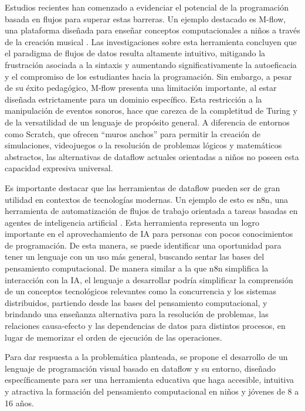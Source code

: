 Estudios recientes han comenzado a evidenciar el potencial de la programación basada en flujos para superar estas barreras. Un ejemplo destacado es M-flow, una plataforma diseñada para enseñar conceptos computacionales a niños a través de la creación musical \cite{mflow2023}. Las investigaciones sobre esta herramienta concluyen que el paradigma de flujos de datos resulta altamente intuitivo, mitigando la frustración asociada a la sintaxis y aumentando significativamente la autoeficacia y el compromiso de los estudiantes hacia la programación. Sin embargo, a pesar de su éxito pedagógico, M-flow presenta una limitación importante, al estar diseñada estrictamente para un dominio específico. Esta restricción a la manipulación de eventos sonoros, hace que carezca de la completitud de Turing y de la versatilidad de un lenguaje de propósito general. A diferencia de entornos como Scratch, que ofrecen ``muros anchos'' \cite{resnicketal2009} para permitir la creación de simulaciones, videojuegos o la resolución de problemas lógicos y matemáticos abstractos, las alternativas de dataflow actuales orientadas a niños no poseen esta capacidad expresiva universal.

Es importante destacar que las herramientas de dataflow pueden ser de gran utilidad en contextos de tecnologías modernas. Un ejemplo de esto es n8n, una herramienta de automatización de flujos de trabajo orientada a tareas basadas en agentes de inteligencia artificial \cite{n8n2025}. Esta herramienta representa un logro importante en el aprovechamiento de IA para personas con pocos conocimientos de programación. De esta manera, se puede identificar una oportunidad para tener un lenguaje con un uso más general, buscando sentar las bases del pensamiento computacional. De manera similar a la que n8n simplifica la interacción con la IA, el lenguaje a desarrollar podría simplificar la comprensión de un conceptos tecnológicos relevantes como la concurrencia y los sistemas distribuidos, partiendo desde las bases del pensamiento computacional, y brindando una enseñanza alternativa para la resolución de problemas, las relaciones causa-efecto y las dependencias de datos para distintos procesos, en lugar de memorizar el orden de ejecución de las operaciones.

Para dar respuesta a la problemática planteada, se propone el desarrollo de un lenguaje de programación visual basado en dataflow y su entorno, diseñado específicamente para ser una herramienta educativa que haga accesible, intuitiva y atractiva la formación del pensamiento computacional en niños y jóvenes de 8 a 16 años.